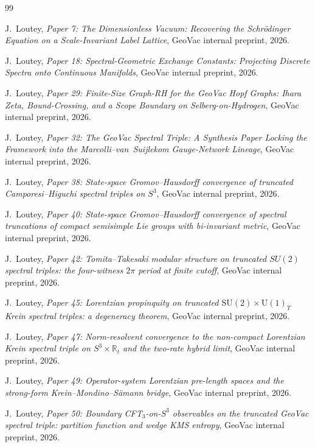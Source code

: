 \documentclass[11pt,a4paper]{article}
\theoremstyle{plain}
\theoremstyle{definition}
\begin{document}
\begin{thebibliography}{99}

 J.~Loutey,
\emph{Paper 7: The Dimensionless Vacuum: Recovering the Schr\"odinger
Equation on a Scale-Invariant Label Lattice},
GeoVac internal preprint, 2026.

 J.~Loutey,
\emph{Paper 18: Spectral-Geometric Exchange Constants: Projecting
Discrete Spectra onto Continuous Manifolds},
GeoVac internal preprint, 2026.

 J.~Loutey,
\emph{Paper 29: Finite-Size Graph-RH for the GeoVac Hopf Graphs: Ihara Zeta, Bound-Crossing, and a Scope Boundary on Selberg-on-Hydrogen},
GeoVac internal preprint, 2026.

 J.~Loutey,
\emph{Paper 32: The GeoVac Spectral Triple: A Synthesis Paper Locking
the Framework into the Marcolli--van~Suijlekom Gauge-Network Lineage},
GeoVac internal preprint, 2026.

 J.~Loutey,
\emph{Paper 38: State-space Gromov--Hausdorff convergence of truncated
Camporesi--Higuchi spectral triples on $S^3$},
GeoVac internal preprint, 2026.

 J.~Loutey,
\emph{Paper 40: State-space Gromov--Hausdorff convergence of spectral truncations of compact semisimple Lie groups with bi-invariant metric},
GeoVac internal preprint, 2026.

 J.~Loutey,
\emph{Paper 42: Tomita--Takesaki modular structure on truncated
$SU(2)$ spectral triples: the four-witness $2\pi$ period at finite
cutoff},
GeoVac internal preprint, 2026.

 J.~Loutey,
\emph{Paper 45: Lorentzian propinquity on truncated $\mathrm{SU}(2)\times\mathrm{U}(1)_{T}$ Krein spectral triples: a degeneracy theorem},
GeoVac internal preprint, 2026.

 J.~Loutey,
\emph{Paper 47: Norm-resolvent convergence to the non-compact Lorentzian Krein
spectral triple on $S^3\times\mathbb{R}_t$ and the two-rate hybrid limit},
GeoVac internal preprint, 2026.

 J.~Loutey,
\emph{Paper 49: Operator-system Lorentzian pre-length spaces and the
strong-form Krein--Mondino--S\"amann bridge},
GeoVac internal preprint, 2026.

 J.~Loutey,
\emph{Paper 50: Boundary CFT$_3$-on-$S^3$ observables on the truncated
GeoVac spectral triple: partition function and wedge KMS entropy},
GeoVac internal preprint, 2026.


\end{thebibliography}
\end{document}
